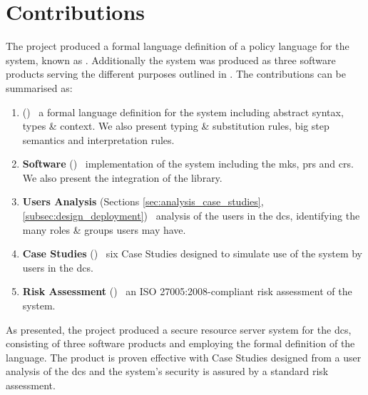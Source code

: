 \section{Contributions}
\label{sec:intro_contrib}

The project produced a formal language definition of a policy language for the \theResServer system, known as \thePolicyLang. Additionally the \theResServer system was produced as three software products serving the different purposes outlined in . The contributions can be summarised as:

\begin{enumerate}
  \item \textbf{\thePolicyLang} () \textemdash\ a formal language definition for the \theResServer system including abstract syntax, types \& context. We also present typing \& substitution rules, big step semantics and interpretation rules.
  \item \textbf{Software} () \textemdash\ implementation of the \theResServer system including the \acrfull{mks}, \acrfull{prs} and \acrfull{crs}. We also present the integration of the \OpenABE library.
  \item \textbf{Users Analysis} (Sections \ref{sec:analysis_case_studies}, \ref{subsec:design_deployment}) \textemdash\ analysis of the users in the \acrfull{dcs}, identifying the many roles \& groups users may have.
  \item \textbf{Case Studies} () \textemdash\ six Case Studies designed to simulate use of the \theResServer system by users in the \acrshort{dcs}.
  \item \textbf{Risk Assessment} () \textemdash\ an ISO 27005:2008-compliant risk assessment of the \theResServer system.
\end{enumerate}

As presented, the project produced a secure resource server system for the \acrfull{dcs}, consisting of three software products and employing the formal definition of the \thePolicyLang language. The product is proven effective with Case Studies designed from a user analysis of the \acrshort{dcs} and the system's security is assured by a standard risk assessment.
